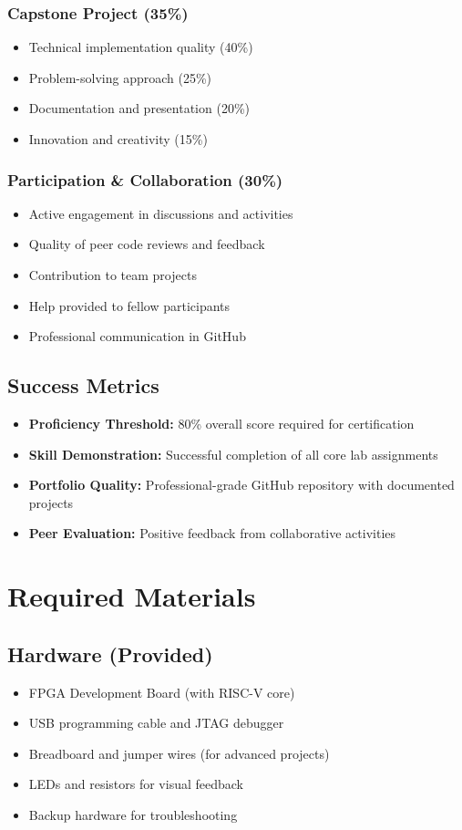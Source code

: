 \documentclass[11pt,a4paper]{article}
\begin{document}
\subsubsection{Capstone Project (35\%)}
\begin{itemize}
    \item Technical implementation quality (40\%)
    \item Problem-solving approach (25\%)
    \item Documentation and presentation (20\%)
    \item Innovation and creativity (15\%)
\end{itemize}

\subsubsection{Participation \& Collaboration (30\%)}
\begin{itemize}
    \item Active engagement in discussions and activities
    \item Quality of peer code reviews and feedback
    \item Contribution to team projects
    \item Help provided to fellow participants
    \item Professional communication in GitHub
\end{itemize}

\subsection{Success Metrics}
\begin{itemize}
    \item \textbf{Proficiency Threshold:} 80\% overall score required for certification
    \item \textbf{Skill Demonstration:} Successful completion of all core lab assignments
    \item \textbf{Portfolio Quality:} Professional-grade GitHub repository with documented projects
    \item \textbf{Peer Evaluation:} Positive feedback from collaborative activities
\end{itemize}

\section{Required Materials}

\subsection{Hardware (Provided)}
\begin{itemize}
    \item FPGA Development Board (with RISC-V core)
    \item USB programming cable and JTAG debugger
    \item Breadboard and jumper wires (for advanced projects)
    \item LEDs and resistors for visual feedback
    \item Backup hardware for troubleshooting
\end{itemize}
\end{document}
